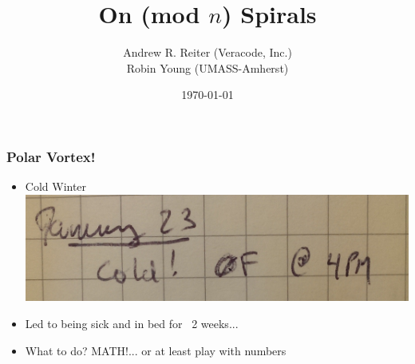 \documentclass{beamer}
\title{On (mod $n$) Spirals}
\author{Andrew R. Reiter (Veracode, Inc.)\\
Robin Young (UMASS-Amherst)}
\date{\today}
\theoremstyle{mydef}
\begin{document}
\frame{\titlepage}



\frame
{
  \frametitle{Polar Vortex!}

  \begin{itemize}
  \item Cold Winter\\
  \includegraphics[scale=.15]{images/PolarVortex1.png}
  \item Led to being sick and in bed for ~2 weeks... 
  \item What to do? MATH!... or at least play with numbers
  \end{itemize}  
}
\end{document}
